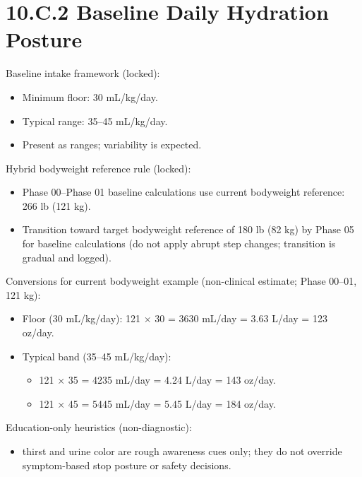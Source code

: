 \documentclass[10pt]{article}
\begin{document}
\newpage

\section*{10.C.2 Baseline Daily Hydration Posture}
{}

Baseline intake framework (locked):

\begin{itemize}
\item Minimum floor: 30 mL/kg/day.
\item Typical range: 35–45 mL/kg/day.
\item Present as ranges; variability is expected.
\end{itemize}

Hybrid bodyweight reference rule (locked):

\begin{itemize}
\item Phase 00–Phase 01 baseline calculations use current bodyweight reference: 266 lb (121 kg).
\item Transition toward target bodyweight reference of 180 lb (82 kg) by Phase 05 for baseline calculations (do not apply abrupt step changes; transition is gradual and logged).
\end{itemize}

Conversions for current bodyweight example (non-clinical estimate; Phase 00–01, 121 kg):

\begin{itemize}
\item Floor (30 mL/kg/day): 121 × 30 = 3630 mL/day = 3.63 L/day = 123 oz/day.
\item Typical band (35–45 mL/kg/day):
  \begin{itemize}
  \item 121 × 35 = 4235 mL/day = 4.24 L/day = 143 oz/day.
  \item 121 × 45 = 5445 mL/day = 5.45 L/day = 184 oz/day.
  \end{itemize}
\end{itemize}

Education-only heuristics (non-diagnostic):
\begin{itemize}
\item thirst and urine color are rough awareness cues only; they do not override symptom-based stop posture or safety decisions.
\end{itemize}
\end{document}
